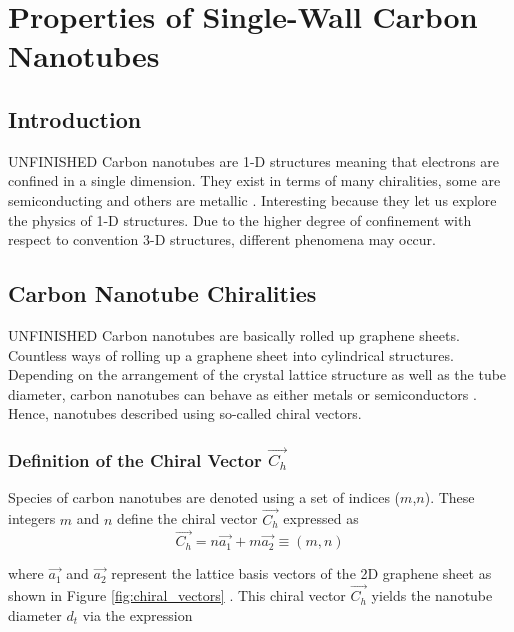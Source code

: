 \chapter{Properties of Single-Wall Carbon Nanotubes}

\section{Introduction}
{\color{red}UNFINISHED} Carbon nanotubes are 1-D structures meaning that electrons are confined in a single dimension. They exist in terms of many chiralities, some are semiconducting and others are metallic \cite{soavi2016ultrafast}. Interesting because they let us explore the physics of 1-D structures. Due to the higher degree of confinement with respect to convention 3-D structures, different phenomena may occur.



\section{Carbon Nanotube Chiralities}

{\color{red}UNFINISHED} Carbon nanotubes are basically rolled up graphene sheets. Countless ways of rolling up a graphene sheet into cylindrical structures. Depending on the arrangement of the crystal lattice structure as well as the tube diameter, carbon nanotubes can behave as either metals or semiconductors \cite{ando1997excitons, nanot2012optoelectronic}. Hence, nanotubes described using so-called chiral vectors.

\subsection{Definition of the Chiral Vector $\vec{C_h}$}



 Species of carbon nanotubes are denoted using a set of indices ($m$,$n$). These integers $m$ and $n$ define the chiral vector $\vec{C_h }$ expressed as 
\begin{equation}
	\vec{C_h} = n {\vec{a_1}} + m {\vec{a_2}} \equiv (m,n)
\end{equation}

where $\vec{a_1}$ and $\vec{a_2}$ represent the lattice basis vectors of the 2D graphene sheet as shown in Figure \ref{fig:chiral_vectors} \cite{nanot2013single}. This chiral vector $\vec{C_h}$ yields the nanotube diameter $d_t$ via the expression



